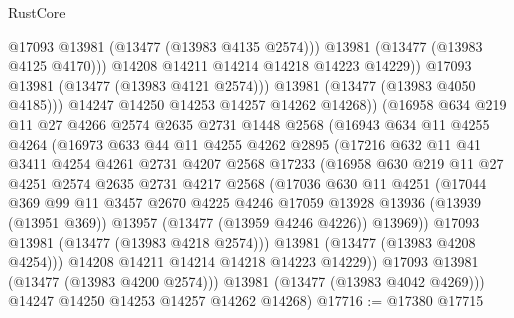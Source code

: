 \begin{lexlean}{RustCore}
\begin{coremodule}
                        @17093
                        @13981
                        (@13477 (@13983 @4135 @2574)))
                      @13981
                      (@13477 (@13983 @4125 @4170)))
                    @14208
                    @14211
                    @14214
                    @14218
                    @14223
                    @14229))
                @17093
                @13981
                (@13477 (@13983 @4121 @2574)))
              @13981
              (@13477 (@13983 @4050 @4185)))
            @14247
            @14250
            @14253
            @14257
            @14262
            @14268))
        (@16958
          @634
          @219
          @11
          @27
          @4266
          @2574
          @2635
          @2731
          @1448
          @2568
          (@16943
            @634
            @11
            @4255
            @4264
            (@16973
              @633
              @44
              @11
              @4255
              @4262
              @2895
              (@17216
                @632
                @11
                @41
                @3411
                @4254
                @4261
                @2731
                @4207
                @2568
                @17233
                (@16958
                  @630
                  @219
                  @11
                  @27
                  @4251
                  @2574
                  @2635
                  @2731
                  @4217
                  @2568
                  (@17036
                    @630
                    @11
                    @4251
                    (@17044
                      @369
                      @99
                      @11
                      @3457
                      @2670
                      @4225
                      @4246
                      @17059
                      @13928
                      @13936
                      (@13939 (@13951 @369))
                      @13957
                      (@13477 (@13959 @4246 @4226))
                      @13969))
                  @17093
                  @13981
                  (@13477 (@13983 @4218 @2574)))
                @13981
                (@13477 (@13983 @4208 @4254)))
              @14208
              @14211
              @14214
              @14218
              @14223
              @14229))
          @17093
          @13981
          (@13477 (@13983 @4200 @2574)))
        @13981
        (@13477 (@13983 @4042 @4269)))
      @14247
      @14250
      @14253
      @14257
      @14262
      @14268)
@17716 := @17380 @17715

\end{coremodule}
\end{lexlean}
